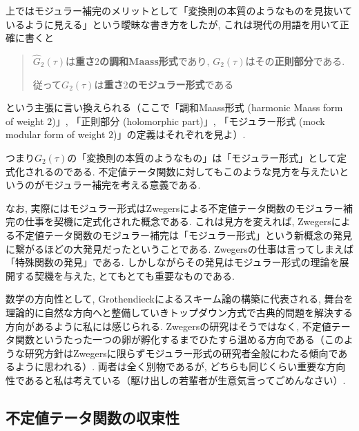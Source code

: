 \documentclass[11pt,b5paper,oneside,lualatex]{ltjsarticle} %
\numberwithin{equation}{section} %
\begin{document}
\begin{rem}
	上ではモジュラー補完のメリットとして「変換則の本質のようなものを見抜いているように見える」という曖昧な書き方をしたが, これは現代の用語を用いて正確に書くと
	\begin{quote}
		\centering
		$ \widehat{G}_2 (\tau) $は\textbf{重さ$ 2 $の調和Maass形式}であり, 
		$ G_2 (\tau) $はその\textbf{正則部分}である. 
		
		従って$ G_2 (\tau) $は\textbf{重さ$ 2 $のモジュラー形式}である
	\end{quote}
	という主張に言い換えられる（ここで「調和Maass形式 (harmonic Maass form of weight $ 2 $)」, 「正則部分 (holomorphic part)」, 「モジュラー形式 (mock modular form of weight $ 2 $)」の定義はそれぞれ\cite[Definition 4.2, Definition 4.4, Definition 5.16 i)]{BFOR}を見よ）. 
	
	つまり$ G_2 (\tau) $の「変換則の本質のようなもの」は「モジュラー形式」として定式化されるのである. 
	不定値テータ関数に対してもこのような見方を与えたいというのがモジュラー補完を考える意義である. 
	
	なお, 実際にはモジュラー形式はZwegersによる不定値テータ関数のモジュラー補完の仕事を契機に定式化された概念である. 
	これは見方を変えれば, Zwegersによる不定値テータ関数のモジュラー補完は「モジュラー形式」という新概念の発見に繋がるほどの大発見だったということである. 
	Zwegersの仕事は言ってしまえば「特殊関数の発見」である. 
	しかしながらその発見はモジュラー形式の理論を展開する契機を与えた, とてもとても重要なものである. 
	
	数学の方向性として, Grothendieckによるスキーム論の構築に代表される, 舞台を理論的に自然な方向へと整備していきトップダウン方式で古典的問題を解決する方向があるように私には感じられる. 
	Zwegersの研究はそうではなく, 不定値テータ関数というたった一つの卵が孵化するまでひたすら温める方向である（このような研究方針はZwegersに限らずモジュラー形式の研究者全般にわたる傾向であるように思われる）. 
	両者は全く別物であるが, どちらも同じくらい重要な方向性であると私は考えている（駆け出しの若輩者が生意気言ってごめんなさい）. 
\end{rem}



\subsection{不定値テータ関数の収束性} \label{subsec:indefinite_theta_convergency}
\end{document}
